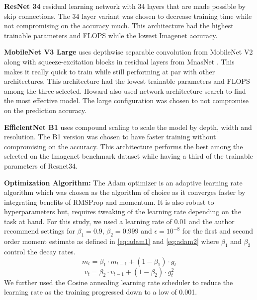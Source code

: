 \documentclass[10pt,twocolumn,letterpaper]{article}
\begin{document}
\textbf{ResNet 34} residual learning network with 34 layers that are made possible by skip 
connections. The 34 layer variant was chosen to decrease training time while not compromising on 
the accuracy much. This architecture had the highest trainable parameters and FLOPS while the lowest 
Imagenet accuracy.
\cite{he2016deep}

\textbf{MobileNet V3 Large} uses depthwise separable convolution from MobileNet V2 
\cite{sandler2018mobilenetv2} along with squeeze-excitation blocks in residual layers 
from MnasNet \cite{tan2019mnasnet}. This makes it really quick to train while still performing 
at par with other architectures. This architecture had the lowest trainable parameters and FLOPS 
among the three selected. Howard \etal \cite{howard2019searching} also used 
network architecture search to find the most effective model. The large configuration 
was chosen to not compromise on the prediction accuracy.

\textbf{EfficientNet B1} uses compound scaling to scale the model by depth, width and 
resolution. The B1 version was chosen to have faster training without compromising on the 
accuracy. \cite{tan2019efficientnet} This architecture performs the best among the selected 
on the Imagenet benchmark dataset while having a third of the trainable parameters of Resnet34.

\textbf{Optimization Algorithm:}
The Adam optimizer \cite{kingma2014adam} is an adaptive learning rate algorithm which 
was chosen as the algorithm of choice as it converges faster by integrating benefits of  
RMSProp and momentum. It is also robust to hyperparameters but, 
requires tweaking of the learning rate depending on the task at hand. For this study, 
we used a learning rate of 0.01 and the author recommend settings for $\beta_{1} =
0.9$, $\beta_{2} = 0.999$ and $\epsilon = 10^{-8}$ for the first and second order moment estimate 
as defined in \cref{eq:adam1} and \cref{eq:adam2} where $\beta_{1}$ and $\beta_{2}$ control the decay rates.
\begin{equation}
m_{t} = \beta_{1} \cdot m_{t-1} + (1 - \beta_{1}) \cdot g_{t}
\label{eq:adam1}
\end{equation}
\begin{equation}
  v_{t} = \beta_{2} \cdot v_{t-1} + (1 - \beta_{2}) \cdot g_{t}^{2}
  \label{eq:adam2}
  \end{equation}
We further used the Cosine annealing \cite{loshchilov2016sgdr} learning rate scheduler 
to reduce the learning rate as the training progressed down to a low of 0.001. 
\end{document}
